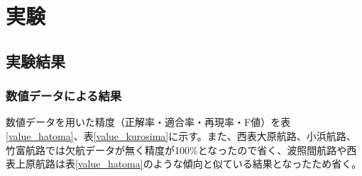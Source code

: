 \chapter{実験}
\label{chap:poordirection}

\section{実験結果}

\subsection{数値データによる結果}
数値データを用いた精度（正解率・適合率・再現率・F値）を表\ref{value_hatoma}、表\ref{value_kurosima}に示す。また、西表大原航路、小浜航路、竹富航路では欠航データが無く精度が100\%となったので省く、波照間航路や西表上原航路は表\ref{value_hatoma}のような傾向と似ている結果となったため省く。


